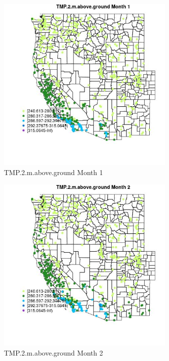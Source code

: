 \begin{figure} 
\centering  
\includegraphics[width=0.77\textwidth]{Code_Outputs/Report_ML_input_PM25_Step4_part_e_de_duplicated_aves_compiled_2019-05-21wNAs_MapObsMo1TMP2maboveground.jpg} 
\caption{\label{fig:Report_ML_input_PM25_Step4_part_e_de_duplicated_aves_compiled_2019-05-21wNAsMapObsMo1TMP2maboveground}TMP.2.m.above.ground Month 1} 
\end{figure} 
 

\begin{figure} 
\centering  
\includegraphics[width=0.77\textwidth]{Code_Outputs/Report_ML_input_PM25_Step4_part_e_de_duplicated_aves_compiled_2019-05-21wNAs_MapObsMo2TMP2maboveground.jpg} 
\caption{\label{fig:Report_ML_input_PM25_Step4_part_e_de_duplicated_aves_compiled_2019-05-21wNAsMapObsMo2TMP2maboveground}TMP.2.m.above.ground Month 2} 
\end{figure} 
 

